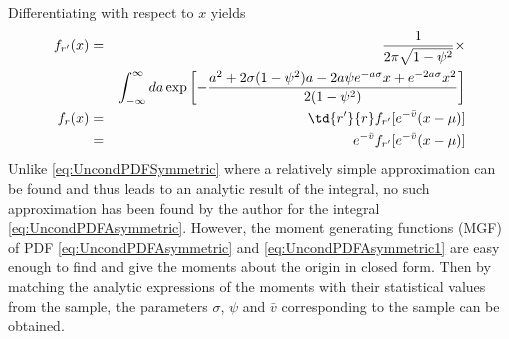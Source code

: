 Differentiating with respect to $x$ yields
\begin{eqnarray}
  f_{r'}(x) &=& {1 \over 2\pi \sqrt{1 - \psi^2}} \times \nonumber \\
  && \int_{-\infty}^\infty da \exp
  \left[- {
      a^2 + 2\sigma(1 - \psi^2)a - 2a\psi e^{-a\sigma} x + e^{-2a\sigma} x^2
      \over
      2(1 - \psi^2)
  }
  \right] \label{eq:UncondPDFAsymmetric} \\
  f_r(x) &=&  \td{r'}{r} f_{r'}[e^{-\bar{v}} (x - \mu)] \nonumber \\
  &=& e^{-\bar{v}} f_{r'}[e^{-\bar{v}}
  (x-\mu)] \label{eq:UncondPDFAsymmetric1}
\end{eqnarray}
Unlike \ref{eq:UncondPDFSymmetric} where a relatively simple
approximation can be found and thus leads to an analytic result of the
integral, no such approximation has been found by the
author for the integral \ref{eq:UncondPDFAsymmetric}. However, the
moment generating functions (MGF) of PDF \ref{eq:UncondPDFAsymmetric}
and \ref{eq:UncondPDFAsymmetric1} are easy enough to find and give the
moments about the origin in closed form. Then by matching the analytic
expressions of the moments with their statistical values from the
sample, the parameters $\sigma$, $\psi$ and $\bar{v}$ corresponding to the
sample can be obtained.

